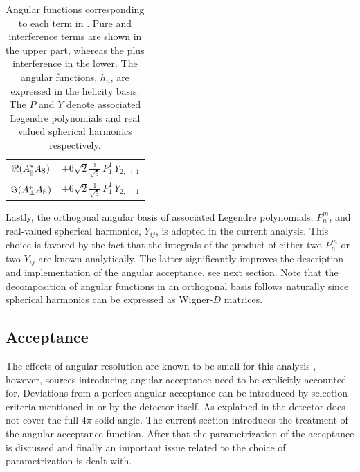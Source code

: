\begin{table}[t]
\begin{tabular}{cc}
    $\Re({A}_{\parallel}^* {A}_{{\text{S}}})$  &
      $+6\sqrt{2}\tfrac{1}{\sqrt{5}}\, P_1^1\, Y_{2,\,+1}$  \\ %

    $\Im({A}_{\perp}^* {A}_{{\text{S}}})$  &
      $+6\sqrt{2}\tfrac{1}{\sqrt{5}}\, P_1^1\, Y_{2,\,-1}$  \\ %
    \hline
  \end{tabular}
  \caption{Angular functions corresponding to each term in . Pure and interference \pwave terms are shown in the upper part,
    whereas the \swave plus \spwave interference in the lower. The angular functions, $h_n$, are expressed in the helicity basis.
    The $P$ and $Y$ denote associated Legendre polynomials and real valued spherical harmonics respectively.}
  \label{ang_distr}
\end{table}

Lastly, the orthogonal angular basis of associated Legendre polynomials, $P_n^m$, and real-valued
spherical harmonics, $Y_{ij}$, is adopted in the current analysis. This choice is favored by the
fact that the integrals of the product of either two $P_n^m$ or two $Y_{ij}$ are known analytically.
The latter significantly improves the description and implementation of the angular acceptance, see next section.
Note that the decomposition of angular functions in an orthogonal basis follows naturally since spherical
harmonics can be expressed as Wigner-$D$ matrices.

\subsection{Acceptance}
\label{Accceptance}

The effects of angular resolution are known to be small for this analysis \cite{tristanThesis},
however, sources introducing angular acceptance need to be explicitly accounted for.
Deviations from a perfect angular acceptance can be introduced by selection criteria mentioned in  or by the detector itself.
As explained in  the \lhcb detector does not cover the full $4\pi$ solid angle.
The current section introduces the treatment of the angular acceptance function. After that the parametrization
of the acceptance is discussed and finally an important issue related to the choice of parametrization is dealt with.

